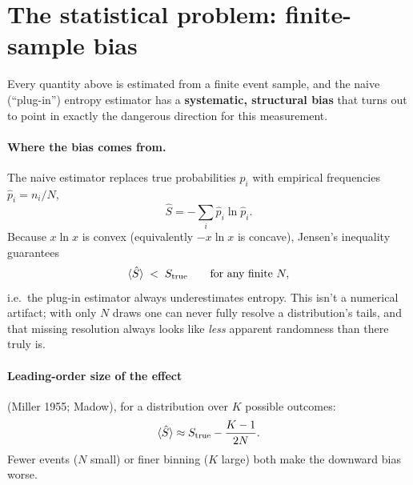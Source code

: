 \documentclass[11pt]{article}
\newcommand{\Strue}{S_{\rm true}}
\begin{document}
\section{The statistical problem: finite-sample bias}
\label{sec:bias}

Every quantity above is estimated from a finite event sample, and the
naive (``plug-in'') entropy estimator has a \textbf{systematic, structural
bias} that turns out to point in exactly the dangerous direction for this
measurement.

\paragraph{Where the bias comes from.} The naive estimator replaces true
probabilities $p_i$ with empirical frequencies $\hat p_i=n_i/N$,
\begin{equation}
\hat S = -\sum_i \hat p_i \ln \hat p_i .
\end{equation}
Because $x\ln x$ is convex (equivalently $-x\ln x$ is concave), Jensen's
inequality guarantees
\begin{equation}
\langle \hat S \rangle \;<\; \Strue \qquad \text{for any finite } N,
\end{equation}
i.e.\ the plug-in estimator always underestimates entropy. This isn't a
numerical artifact; with only $N$ draws one can never fully resolve a
distribution's tails, and that missing resolution always looks like
\emph{less} apparent randomness than there truly is.

\paragraph{Leading-order size of the effect} (Miller 1955; Madow), for a
distribution over $K$ possible outcomes:
\begin{equation}
\langle \hat S \rangle \approx \Strue - \frac{K-1}{2N}.
\end{equation}
Fewer events ($N$ small) or finer binning ($K$ large) both make the
downward bias worse.
\end{document}
